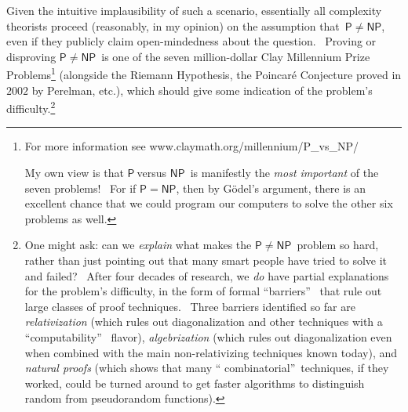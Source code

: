 \documentclass[11pt,onecolumn]{article}%
\begin{document}
Given the intuitive implausibility of such a scenario, essentially all
complexity theorists proceed (reasonably, in my opinion) on the assumption
that\ $\mathsf{P}\neq\mathsf{NP}$, even if they publicly claim open-mindedness
about the question. \ Proving or disproving $\mathsf{P}\neq\mathsf{NP}$\ is
one of the seven million-dollar Clay Millennium Prize Problems\footnote{For
more information see www.claymath.org/millennium/P\_vs\_NP/
\par
My own view is that $\mathsf{P}\ $versus $\mathsf{NP}$\ is manifestly the
\textit{most important} of the seven problems! \ For if $\mathsf{P}%
=\mathsf{NP}$, then by G\"{o}del's argument, there is an excellent chance that
we could program our computers to solve the other six problems as well.}
(alongside the Riemann Hypothesis, the Poincar\'{e} Conjecture proved in
$2002$ by Perelman, etc.), which should give some indication of the problem's
difficulty.\footnote{One might ask: can we \textit{explain} what makes the
$\mathsf{P}\neq\mathsf{NP}$\ problem so hard, rather than just pointing out
that many smart people have tried to solve it and failed? \ After four decades
of research, we \textit{do} have partial explanations for the problem's
difficulty, in the form of formal \textquotedblleft barriers\textquotedblright%
\ that rule out large classes of proof techniques. \ Three barriers identified
so far are \textit{relativization} \cite{bgs} (which rules out diagonalization
and other techniques with a \textquotedblleft computability\textquotedblright%
\ flavor), \textit{algebrization} \cite{awig} (which rules out diagonalization
even when combined with the main non-relativizing techniques known today), and
\textit{natural proofs} \cite{rr} (which shows that many \textquotedblleft
combinatorial\textquotedblright\ techniques, if they worked, could be turned
around to get faster algorithms to distinguish random from pseudorandom
functions).}
\end{document}
